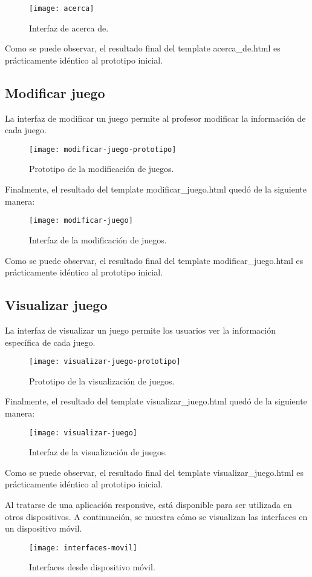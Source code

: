 \begin{figure}[htb]
\centering
\texttt{[image: acerca]}
\caption{Interfaz de acerca de.}
\label{fig:acerca}
\end{figure}

Como se puede observar, el resultado final del template acerca\_de.html es prácticamente idéntico al prototipo inicial. 

\subsection{Modificar juego}
La interfaz de modificar un juego permite al profesor modificar la información de cada juego.
\begin{figure}[htb]
\centering
\texttt{[image: modificar-juego-prototipo]}
\caption{Prototipo de la modificación de juegos.}
\label{fig:modificar-juego-prototipo}
\end{figure}

Finalmente, el resultado del template modificar\_juego.html quedó de la siguiente manera:
\newpage
\begin{figure}[htb]
\centering
\texttt{[image: modificar-juego]}
\caption{Interfaz de la modificación de juegos.}
\label{fig:modificar-juego}
\end{figure}

Como se puede observar, el resultado final del template modificar\_juego.html es prácticamente idéntico al prototipo inicial. 

\subsection{Visualizar juego}
La interfaz de visualizar un juego permite los usuarios ver la información específica de cada juego.
\newpage
\begin{figure}[htb]
\centering
\texttt{[image: visualizar-juego-prototipo]}
\caption{Prototipo de la visualización de juegos.}
\label{fig:visualizar-juego-prototipo}
\end{figure}
Finalmente, el resultado del template visualizar\_juego.html quedó de la siguiente manera:
\newpage
\begin{figure}[htb]
\centering
\texttt{[image: visualizar-juego]}
\caption{Interfaz de la visualización de juegos.}
\label{fig:visualizar-juego}
\end{figure}

Como se puede observar, el resultado final del template visualizar\_juego.html es prácticamente idéntico al prototipo inicial. 

Al tratarse de una aplicación responsive, está disponible para ser utilizada en otros dispositivos. A continuación, se muestra cómo se visualizan las interfaces en un dispositivo móvil.
\begin{figure}[htb]
\centering
\texttt{[image: interfaces-movil]}
\caption{Interfaces desde dispositivo móvil.}
\label{fig:interfaces-movil}
\end{figure}